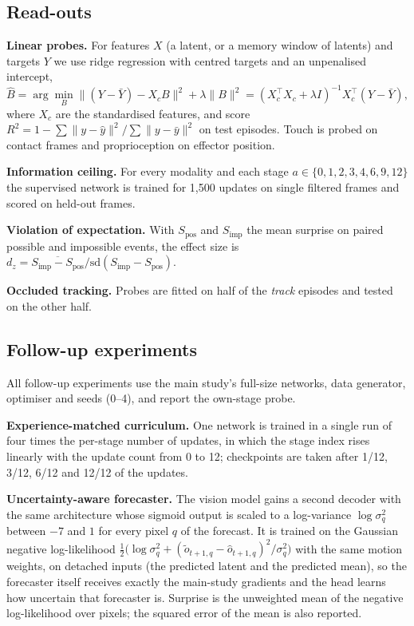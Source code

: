 \documentclass{article}
\theoremstyle{plain}
\theoremstyle{remark}
\begin{document}
\subsection{Read-outs}

\textbf{Linear probes.} For features \(X\) (a latent, or a memory window of latents) and targets \(Y\) we use ridge regression with centred targets and an unpenalised intercept,
\begin{equation}\hat B=\arg\min_B\lVert (Y-\bar Y)-X_cB\rVert^2+\lambda\lVert B\rVert^2=(X_c^\top X_c+\lambda I)^{-1}X_c^\top(Y-\bar Y),\end{equation}
where \(X_c\) are the standardised features, and score \(R^2=1-\sum\lVert y-\hat y\rVert^2/\sum\lVert y-\bar y\rVert^2\) on test episodes. Touch is probed on contact frames and proprioception on effector position.

\textbf{Information ceiling.} For every modality and each stage \(a\in\{0,1,2,3,4,6,9,12\}\) the supervised network is trained for 1,500 updates on single filtered frames and scored on held-out frames.

\textbf{Violation of expectation.} With \(S_{\text{pos}}\) and \(S_{\text{imp}}\) the mean surprise on paired possible and impossible events, the effect size is \(d_z=\overline{S_{\text{imp}}-S_{\text{pos}}}/\mathrm{sd}(S_{\text{imp}}-S_{\text{pos}})\).

\textbf{Occluded tracking.} Probes are fitted on half of the \emph{track} episodes and tested on the other half.

\subsection{Follow-up experiments}
\label{app:followup}

All follow-up experiments use the main study's full-size networks, data generator, optimiser and seeds (0--4), and report the own-stage probe.

\textbf{Experience-matched curriculum.} One network is trained in a single run of four times the per-stage number of updates, in which the stage index rises linearly with the update count from 0 to 12; checkpoints are taken after 1/12, 3/12, 6/12 and 12/12 of the updates.

\textbf{Uncertainty-aware forecaster.} The vision model gains a second decoder with the same architecture whose sigmoid output is scaled to a log-variance \(\log\sigma^2_q\) between \(-7\) and \(1\) for every pixel \(q\) of the forecast. It is trained on the Gaussian negative log-likelihood \(\tfrac12\big(\log\sigma^2_q+(\tilde o_{t+1,q}-\hat o_{t+1,q})^2/\sigma^2_q\big)\) with the same motion weights, on detached inputs (the predicted latent and the predicted mean), so the forecaster itself receives exactly the main-study gradients and the head learns how uncertain that forecaster is. Surprise is the unweighted mean of the negative log-likelihood over pixels; the squared error of the mean is also reported.
\end{document}
